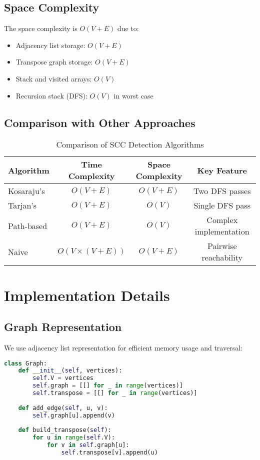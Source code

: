 \documentclass[12pt]{article}
\begin{document}
\subsection{Space Complexity}

The space complexity is $O(V + E)$ due to:
\begin{itemize}
    \item Adjacency list storage: $O(V + E)$
    \item Transpose graph storage: $O(V + E)$
    \item Stack and visited arrays: $O(V)$
    \item Recursion stack (DFS): $O(V)$ in worst case
\end{itemize}

\subsection{Comparison with Other Approaches}

\begin{table}[h]
\centering
\begin{tabular}{lccc}
\toprule
\textbf{Algorithm} & \textbf{Time Complexity} & \textbf{Space Complexity} & \textbf{Key Feature} \\
\midrule
Kosaraju's & $O(V + E)$ & $O(V + E)$ & Two DFS passes \\
Tarjan's & $O(V + E)$ & $O(V)$ & Single DFS pass \\
Path-based & $O(V + E)$ & $O(V)$ & Complex implementation \\
Naive & $O(V \times (V + E))$ & $O(V + E)$ & Pairwise reachability \\
\bottomrule
\end{tabular}
\caption{Comparison of SCC Detection Algorithms}
\end{table}

\section{Implementation Details}
\subsection{Graph Representation}

We use adjacency list representation for efficient memory usage and traversal:

\begin{lstlisting}[language=Python, caption=Graph Class Structure]
class Graph:
    def __init__(self, vertices):
        self.V = vertices
        self.graph = [[] for _ in range(vertices)]
        self.transpose = [[] for _ in range(vertices)]
    
    def add_edge(self, u, v):
        self.graph[u].append(v)
    
    def build_transpose(self):
        for u in range(self.V):
            for v in self.graph[u]:
                self.transpose[v].append(u)
\end{lstlisting}
\end{document}
